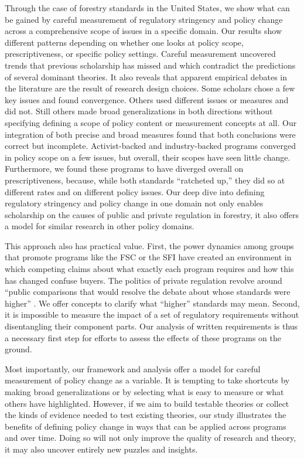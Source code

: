 \documentclass[
      12pt,
            Review ]{article}
\begin{document}
Through the case of forestry standards in the United States, we show what can be gained by careful measurement of regulatory stringency and policy change across a comprehensive scope of issues in a specific domain. Our results show different patterns depending on whether one looks at policy scope, prescriptiveness, or specific policy settings. Careful measurement uncovered trends that previous scholarship has missed and which contradict the predictions of several dominant theories. It also reveals that apparent empirical debates in the literature are the result of research design choices. Some scholars chose a few key issues and found convergence. Others used different issues or measures and did not. Still others made broad generalizations in both directions without specifying defining a scope of policy content or measurement concepts at all. Our integration of both precise and broad measures found that both conclusions were correct but incomplete. Activist-backed and industry-backed programs converged in policy scope on a few issues, but overall, their scopes have seen little change. Furthermore, we found these programs to have diverged overall on prescriptiveness, because, while both standards ``ratcheted up,'' they did so at different rates and on different policy issues. Our deep dive into defining regulatory stringency and policy change in one domain not only enables scholarship on the causes of public and private regulation in forestry, it also offers a model for similar research in other policy domains.

This approach also has practical value. First, the power dynamics among groups that promote programs like the FSC or the SFI have created an environment in which competing claims about what exactly each program requires and how this has changed confuse buyers. The politics of private regulation revolve around ``public comparisons that would resolve the debate about whose standards were higher'' \citep{Overdevest2010}. We offer concepts to clarify what ``higher'' standards may mean. Second, it is impossible to measure the impact of a set of regulatory requirements without disentangling their component parts. Our analysis of written requirements is thus a necessary first step for efforts to assess the effects of these programs on the ground.

Most importantly, our framework and analysis offer a model for careful measurement of policy change as a variable. It is tempting to take shortcuts by making broad generalizations or by selecting what is easy to measure or what others have highlighted. However, if we aim to build testable theories or collect the kinds of evidence needed to test existing theories, our study illustrates the benefits of defining policy change in ways that can be applied across programs and over time. Doing so will not only improve the quality of research and theory, it may also uncover entirely new puzzles and insights.
  \newpage 
  \theendnotes
\newpage
\singlespacing 
           
  
\end{document}
